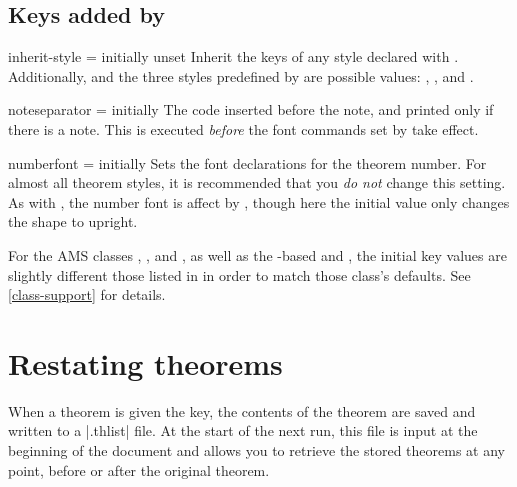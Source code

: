 \documentclass{ltxdoc}
\begin{document}
\subsection{Keys added by }
\label{stylekeys:new}

\begin{docKey}{inherit-style}
  {=}
  {initially unset}
Inherit the keys of any style declared with .
Additionally,  and the three styles predefined by  are possible values: , , and .
\end{docKey}

\begin{docKey}{noteseparator}
  {=}
  {initially \textvisiblespace}
The code inserted before the note, and printed only if there is a note.
This is executed \emph{before} the font commands set by  take effect.
\end{docKey}

\begin{docKey}{numberfont}
  {=}
  {initially }
Sets the font declarations for the theorem number.
For almost all theorem styles, it is recommended that you \emph{do not} change this setting.
As with , the number font is affect by , though here the initial value only changes the shape to upright.
\end{docKey}

\begin{notebox}
For the AMS classes , , and , as well as the -based  and , the initial key values are slightly different those listed in  in order to match those class's defaults.
See \autoref{class-support} for details.
\end{notebox}

\section{Restating theorems}

When a theorem is given the  key, the contents of the theorem are saved and written to a |.thlist| file.
At the start of the next run, this file is input at the beginning of the document and allows you to retrieve the stored theorems at any point, before or after the original theorem.
\end{document}

